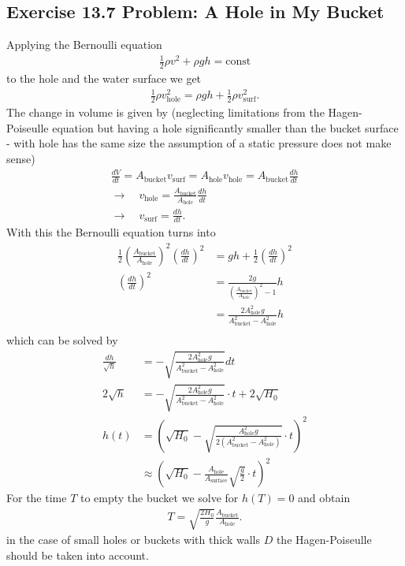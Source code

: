 \documentclass[10pt,a4paper]{book}
\theoremstyle{definition}
\begin{document}
\subsection{Exercise 13.7 Problem: A Hole in My Bucket}
Applying the Bernoulli equation 
\begin{align}
    \frac{1}{2}\rho v^2 + \rho g h = \text{const}
\end{align}
to the hole and the water surface we get
\begin{align}
    \frac{1}{2}\rho v_\text{hole}^2 = \rho g h + \frac{1}{2}\rho v_\text{surf}^2.
\end{align}
The change in volume is given by (neglecting limitations from the Hagen-Poiseulle equation but having a hole significantly smaller than the bucket surface - with hole has the same size the assumption of a static pressure does not make sense)
\begin{align}
    \frac{dV}{dt}=A_\text{bucket}v_\text{surf}=A_\text{hole}v_\text{hole}=A_\text{bucket}\frac{dh}{dt}\\
    \rightarrow\quad v_\text{hole}=\frac{A_\text{bucket}}{A_\text{hole}}\frac{dh}{dt}\\
    \rightarrow\quad v_\text{surf}=\frac{dh}{dt}.
\end{align}
With this the Bernoulli equation turns into
\begin{align}
    \frac{1}{2}\left(\frac{A_\text{bucket}}{A_\text{hole}}\right)^2\left(\frac{dh}{dt}\right)^2&=gh+\frac{1}{2}\left(\frac{dh}{dt}\right)^2\\
    \left(\frac{dh}{dt}\right)^2&=\frac{2g}{\left(\frac{A_\text{bucket}}{A_\text{hole}}\right)^2-1}h\\
    &=\frac{2A_\text{hole}^2g}{A_\text{bucket}^2-A_\text{hole}^2}h\\
\end{align}
which can be solved by
\begin{align}
    \frac{dh}{\sqrt{h}}&=-\sqrt{\frac{2A_\text{hole}^2g}{A_\text{bucket}^2-A_\text{hole}^2}}dt\\
    2\sqrt{h}&=-\sqrt{\frac{2A_\text{hole}^2g}{A_\text{bucket}^2-A_\text{hole}^2}}\cdot t+2\sqrt{H_0}\\
    h(t)&=\left(\sqrt{H_0}-\sqrt{\frac{A_\text{hole}^2g}{2(A_\text{bucket}^2-A_\text{hole}^2)}}\cdot t\right)^2\\
    &\approx\left(\sqrt{H_0}-\frac{A_\text{hole}}{A_\text{surface}}\sqrt{\frac{g}{2}}\cdot t\right)^2
\end{align}
For the time $T$ to empty the bucket we solve for $h(T)=0$ and obtain
\begin{align}
    T = \sqrt{\frac{2H_0}{g}}\frac{A_\text{bucket}}{A_\text{hole}}.
\end{align}
in the case of small holes or buckets with thick walls $D$ the Hagen-Poiseulle should be taken into account.
\end{document}
